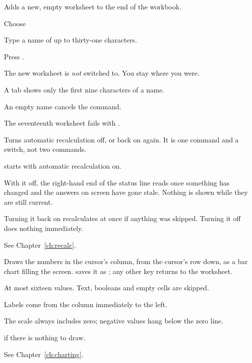 
Adds a new, empty worksheet to the end of the workbook.

\begin{ccprocedure}[]
\item Choose 
\item Type a name of up to thirty-one characters.
\item Press .
\end{ccprocedure}

\begin{ccsteps}
\item The new worksheet is \emph{not} switched to. You stay where you were.
\item A tab shows only the first nine characters of a name.
\item An empty name cancels the command.
\item The seventeenth worksheet fails with .
\end{ccsteps}


Turns automatic recalculation off, or back on again. It is one command and a
switch, not two commands.

\begin{ccsteps}
\item \ccprod{} starts with automatic recalculation on.
\item With it off, the right-hand end of the status line reads  once
something has changed and the answers on screen have gone stale. Nothing is
shown while they are still current.
\item Turning it back on recalculates at once if anything was skipped. Turning
it off does nothing immediately.
\item See Chapter~\ref{ch:recalc}.
\end{ccsteps}


Draws the numbers in the cursor's column, from the cursor's row down, as a bar
chart filling the screen.  saves it as ; any other key
returns to the worksheet.

\begin{ccsteps}
\item At most sixteen values. Text, booleans and empty cells are skipped.
\item Labels come from the column immediately to the left.
\item The scale always includes zero; negative values hang below the zero line.
\item {} if there is nothing to draw.
\item See Chapter~\ref{ch:charting}.
\end{ccsteps}

